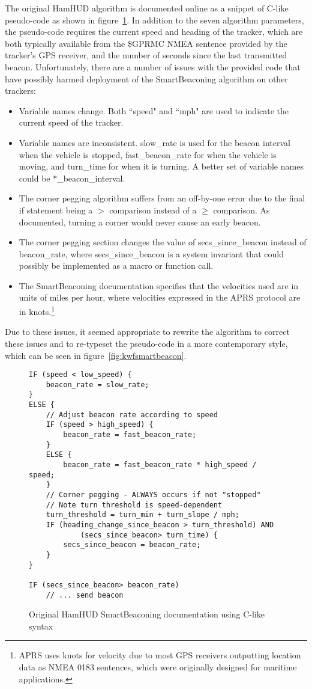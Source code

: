 The original HamHUD algorithm is documented online as a snippet of C-like 
pseudo-code as shown in figure~\ref{fig:hamhudsmartbeacon}.
In addition to the seven algorithm parameters, the pseudo-code
requires the current speed and heading of the tracker, which are both
typically available from the \$GPRMC NMEA sentence \cite{nmearmc} provided by the 
tracker's GPS receiver, and the number of seconds since the last transmitted beacon.
Unfortunately, there are a number of issues with the provided code that
have possibly harmed deployment of the SmartBeaconing algorithm on other trackers:
\begin{itemize}
	\item Variable names change. Both ``speed" and ``mph" are used 
		to indicate the current speed of the tracker.
	\item Variable names are inconsistent. 
		slow\_rate is used for the beacon interval when the vehicle is stopped, 
		fast\_beacon\_rate for when the vehicle is moving,
		and turn\_time for when it is turning.
		A better set of variable names could be *\_beacon\_interval.
	\item The corner pegging algorithm suffers from an off-by-one error due to
		the final if statement being a $>$ comparison instead
		of a $\geq$ comparison. As documented, turning a corner would
		never cause an early beacon.
	\item The corner pegging section changes the value of secs\_since\_beacon
		instead of beacon\_rate, where secs\_since\_beacon is a system
		invariant that could possibly be implemented as a macro
		or function call.
	\item The SmartBeaconing documentation specifies that 
		the velocities used are in units
		of miles per hour, where velocities expressed in the APRS
		protocol are in knots.\footnote{APRS uses knots for velocity
			due to most GPS receivers outputting location
			data as NMEA 0183 sentences, which were originally designed 
			for maritime applications.}
\end{itemize}

Due to these issues, it seemed appropriate to rewrite the algorithm 
to correct these issues and to re-typeset the pseudo-code in a more
contemporary style, which can be seen in figure~\ref{fig:kwfsmartbeacon}.

\begin{figure}[p]
\begin{lstlisting}
IF (speed < low_speed) {
	beacon_rate = slow_rate;
}
ELSE {
	// Adjust beacon rate according to speed
	IF (speed > high_speed) {
		beacon_rate = fast_beacon_rate;
	}
	ELSE {
		beacon_rate = fast_beacon_rate * high_speed / speed;
	}
	// Corner pegging - ALWAYS occurs if not "stopped"
	// Note turn threshold is speed-dependent
	turn_threshold = turn_min + turn_slope / mph;
	IF (heading_change_since_beacon > turn_threshold) AND
			(secs_since_beacon> turn_time) {
		secs_since_beacon = beacon_rate;
	}
}

IF (secs_since_beacon> beacon_rate)
	// ... send beacon
\end{lstlisting}
\caption{Original HamHUD SmartBeaconing documentation using C-like syntax}
\label{fig:hamhudsmartbeacon}
\end{figure}

